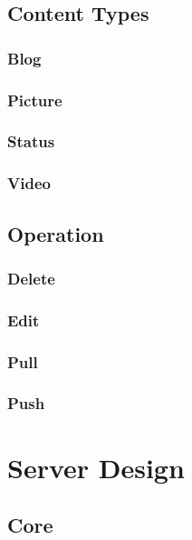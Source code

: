 \documentclass{report}
\begin{document}
		\subsection{Content Types}

			\subsubsection{Blog}

			\subsubsection{Picture}

			\subsubsection{Status}

			\subsubsection{Video}
		\subsection{Operation}

			\subsubsection{Delete}
				
			\subsubsection{Edit}
			
			\subsubsection{Pull}	
			
			\subsubsection{Push}	

	\section{Server Design}
		\subsection{Core}
\end{document}
